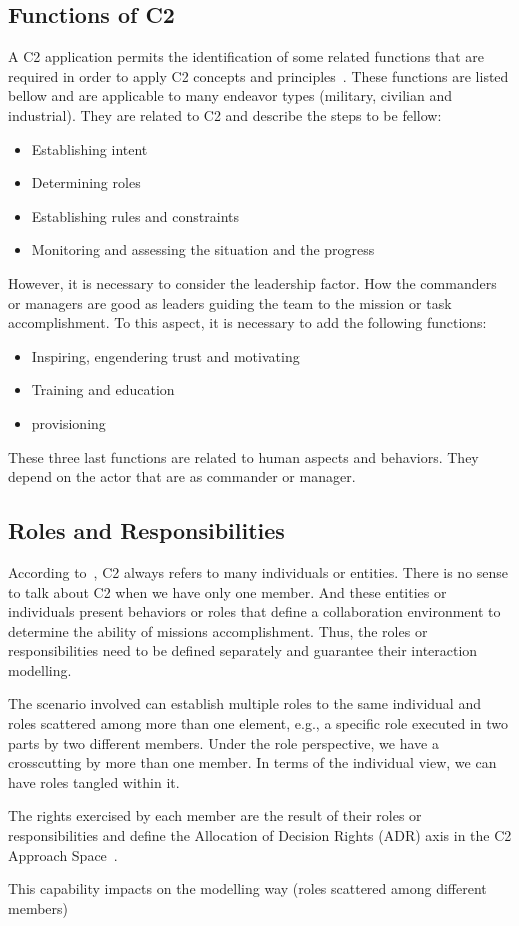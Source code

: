 \subsection {Functions of C2}

A C2 application permits the identification of some related functions that are required in order to apply C2 concepts and principles~\cite{Alberts2006}. These functions are listed bellow and are applicable to many endeavor types (military, civilian and industrial). They are related to C2 and describe the steps to be fellow:
\begin{itemize}
    \item Establishing intent
    \item Determining roles
    \item Establishing rules and constraints
    \item Monitoring and assessing the situation and the progress
\end{itemize}

However, it is necessary to consider the leadership factor. How the commanders or managers are good as leaders guiding the team to the mission or task accomplishment. To this aspect, it is necessary to add the following functions:

\begin{itemize}
    \item Inspiring, engendering trust and motivating
    \item Training and education
    \item provisioning
\end{itemize}

These three last functions are related to human aspects and behaviors. They depend on the actor that are as commander or manager.



\subsection {Roles and Responsibilities}

According to~\citet{Alberts2006}, C2 always refers to many individuals or entities. There is no sense to talk about C2 when we have only one member. And these entities or individuals present behaviors or roles that define a collaboration environment to determine the ability of missions accomplishment. Thus, the roles or responsibilities need to be defined separately and guarantee their interaction modelling.

The scenario involved can establish multiple roles to the same individual and roles scattered among more than one element, e.g., a specific role executed in two parts by two different members. Under the role perspective, we have a crosscutting by more than one member. In terms of the individual view, we can have roles tangled within it.

The rights exercised by each member are the result of their roles or responsibilities and define the Allocation of Decision Rights (ADR) axis in the C2 Approach Space~\citet{FRANCE2014}.

This capability impacts on the modelling way (roles scattered among different members)
